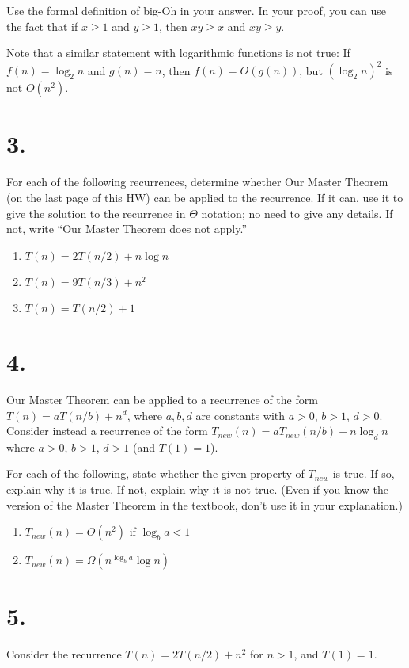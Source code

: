 \documentclass{article}
\begin{document}
Use the formal definition of big-Oh in your answer. In your proof, you can use the fact that if $x \ge 1$ and $y \ge 1$, then $xy \ge x$ and $xy \ge y$.

Note that a similar statement with logarithmic functions is not true: If $f(n) = \log_2 n$ and $g(n) = n$, then $f(n) = O(g(n))$, but $(\log_2 n)^2$ is not $O(n^2)$.



\section*{3.}
For each of the following recurrences, determine whether Our Master Theorem (on the last page of this HW) can be applied to the recurrence. If it can, use it to give the solution to the recurrence in $\Theta$ notation; no need to give any details. If not, write “Our Master Theorem does not apply.”

\begin{enumerate}[label=(\alph*)]
    \item $T(n) = 2T(n/2) + n \log n$
    \item $T(n) = 9T(n/3) + n^2$
    \item $T(n) = T(n/2) + 1$
\end{enumerate}



\section*{4.}
Our Master Theorem can be applied to a recurrence of the form $T(n) = aT(n/b) + n^d$, where $a, b, d$ are constants with $a > 0$, $b > 1$, $d > 0$. Consider instead a recurrence of the form $T_{new}(n) = aT_{new}(n/b) + n \log_d n$ where $a > 0$, $b > 1$, $d > 1$ (and $T(1) = 1$).

For each of the following, state whether the given property of $T_{new}$ is true. If so, explain why it is true. If not, explain why it is not true. (Even if you know the version of the Master Theorem in the textbook, don’t use it in your explanation.)

\begin{enumerate}[label=(\alph*)]
    \item $T_{new}(n) = O(n^2)$ if $\log_b a < 1$
    \item $T_{new}(n) = \Omega(n^{\log_b a} \log n)$
\end{enumerate}



\section*{5.}
Consider the recurrence $T(n) = 2T(n/2) + n^2$ for $n > 1$, and $T(1) = 1$.
\end{document}
